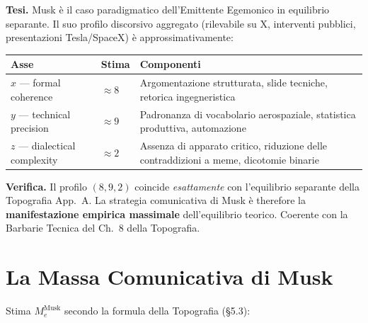 \Hypoth{} \textbf{Tesi.} Musk è il caso paradigmatico dell'Emittente
Egemonico in equilibrio separante. Il suo profilo discorsivo aggregato
(rilevabile su X, interventi pubblici, presentazioni Tesla/SpaceX) è
approssimativamente:

{\def\LTcaptype{none} %
{\small\begin{longtable}[]{@{}
  >{\raggedright\arraybackslash}p{}
  >{\raggedright\arraybackslash}p{}
  >{\raggedright\arraybackslash}p{}@{}}
\toprule\noalign{}
\begin{minipage}[b]{\linewidth}\raggedright
Asse
\end{minipage} & \begin{minipage}[b]{\linewidth}\raggedright
Stima
\end{minipage} & \begin{minipage}[b]{\linewidth}\raggedright
Componenti
\end{minipage} \\
\midrule\noalign{}
\endhead
\bottomrule\noalign{}
\endlastfoot
\(x\) --- formal coherence & \(\approx 8\) & Argomentazione strutturata,
slide tecniche, retorica ingegneristica \\
\(y\) --- technical precision & \(\approx 9\) & Padronanza di vocabolario
aerospaziale, statistica produttiva, automazione \\
\(z\) --- dialectical complexity & \(\approx 2\) & Assenza di apparato
critico, riduzione delle contraddizioni a meme, dicotomie binarie \\
\end{longtable}}
}

\Proved{} \textbf{Verifica.} Il profilo \((8, 9, 2)\) coincide
\emph{esattamente} con l'equilibrio separante della Topografia App.~A.
La strategia comunicativa di Musk è therefore la \textbf{manifestazione
empirica massimale} dell'equilibrio teorico. Coerente con la Barbarie
Tecnica del Ch.~8 della Topografia.



\section{La Massa Comunicativa di
Musk}\label{la-massa-comunicativa-di-musk}

Stima \(M_e^{\text{Musk}}\) secondo la formula della Topografia (\S{}5.3):

